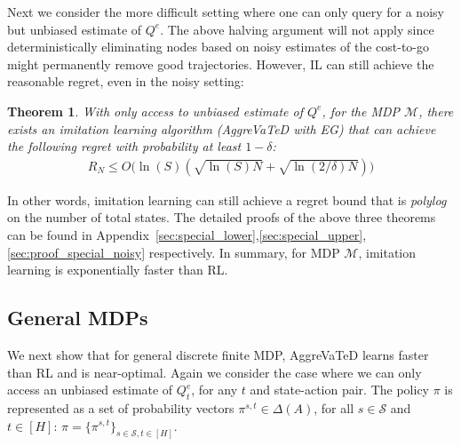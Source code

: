 \documentclass{article}
\newtheorem{theorem}{Theorem}[section]
\begin{document}
Next we consider the more difficult setting where one can only query for a noisy but unbiased estimate of $Q^e$. The above halving argument will not apply since deterministically eliminating nodes based on noisy estimates of the cost-to-go might permanently remove good trajectories. However, IL can still achieve the reasonable regret, even in the noisy setting:
\begin{theorem}
\label{them:special_lower_noisy}
With only access to unbiased estimate of $Q^e$, for the MDP ${\mathcal{M}}$, there exists an imitation learning algorithm (AggreVaTeD with EG) that can achieve the following regret with probability at least $1-\delta$:
\begin{align}
R_N \leq O\Big(\ln(S)(\sqrt{\ln(S)N}+\sqrt{\ln(2/\delta)N})\Big)
\end{align}
\end{theorem} In other words, imitation learning can still achieve a regret bound that is \emph{polylog} on the number of total states. The detailed proofs of the above three theorems can be found in Appendix~\ref{sec:special_lower},\ref{sec:special_upper},\ref{sec:proof_special_noisy} respectively. %
In summary, for MDP ${\mathcal{M}}$, imitation learning is exponentially faster than RL. 

\subsection{General MDPs}
We next show that for general discrete finite MDP, AggreVaTeD learns faster than RL and is near-optimal.
Again we consider the case where we can only access an unbiased estimate of $Q^e_t$, for any $t$ and state-action pair. The policy $\pi$ is represented as a set of probability vectors $\pi^{s,t}\in\Delta(A)$, for all $s \in\mathcal{S}$ and  $t\in[H]$: $\pi = \{\pi^{s,t}\}_{s\in\mathcal{S},t\in[H]}$. %

\end{document}
